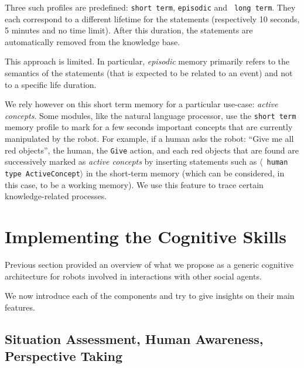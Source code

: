 \documentclass[preprint,5p]{elsarticle}
\newcommand{\concept}[1]{{\small \texttt{#1}}}
\newcommand{\stmt}[1]{{\footnotesize \tt $\langle$ #1\relax$\rangle$}}
\begin{document}
Three such profiles are predefined: {\tt short term}, {\tt episodic} and {\tt
long term}. They each correspond to a different lifetime for the statements
(respectively 10 seconds, 5 minutes and no time limit). After this duration,
the statements are automatically removed from the knowledge base.

This approach is limited. In particular, \emph{episodic} memory primarily
refers to the semantics of the statements (that is expected to be related to an
event) and not to a specific life duration.

We rely however on this short term memory for a particular use-case:
\emph{active concepts}. Some modules, like the natural language processor, use
the {\tt short term} memory profile to mark for a few seconds important
concepts that are currently manipulated by the robot. For example, if a human
asks the robot: ``Give me all red objects'', the human, the \concept{Give}
action, and each red objects that are found are successively marked as
\emph{active concepts} by inserting statements such as \stmt{human type
ActiveConcept} in the short-term memory (which can be considered, in this case,
to be a working memory). We use this feature to trace certain knowledge-related
processes.


\section{Implementing the Cognitive Skills}

Previous section provided an overview of what we propose as a generic cognitive
architecture for robots involved in interactions with other social agents.

We now introduce each of the components and try to give insights on their main
features.


\subsection{Situation Assessment, Human Awareness, Perspective Taking}
\label{sect|sit-ass}
\end{document}
